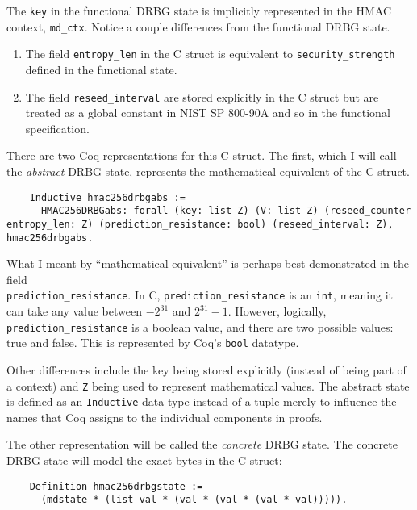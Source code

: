 \documentclass[pageno]{jpaper}
\begin{document}
The \lstinline{key} in the functional DRBG state is implicitly represented in the HMAC context, \lstinline{md_ctx}. Notice a couple differences from the functional DRBG state.


\begin{enumerate}
\item The field \lstinline{entropy_len} in the C struct is equivalent to \lstinline{security_strength} defined in the functional state.
\item The field \lstinline{reseed_interval} are stored explicitly in the C struct but are treated as a global constant in NIST SP 800-90A and so in the functional specification.
\end{enumerate}


There are two Coq representations for this C struct. The first, which I will call the \textit{abstract} DRBG state, represents the mathematical equivalent of the C struct.

\begin{lstlisting}
    Inductive hmac256drbgabs :=
      HMAC256DRBGabs: forall (key: list Z) (V: list Z) (reseed_counter entropy_len: Z) (prediction_resistance: bool) (reseed_interval: Z), hmac256drbgabs.
\end{lstlisting}

What I meant by “mathematical equivalent” is perhaps best demonstrated in the field \\ \lstinline{prediction_resistance}. In C, \lstinline{prediction_resistance} is an \lstinline{int}, meaning it can take any value between $-2^{31}$ and $2^{31} - 1$. However, logically, \lstinline{prediction_resistance} is a boolean value, and there are two possible values: true and false. This is represented by Coq’s \lstinline{bool} datatype.

Other differences include the key being stored explicitly (instead of being part of a context) and \lstinline{Z} being used to represent mathematical values. The abstract state is defined as an \lstinline{Inductive} data type instead of a tuple merely to influence the names that Coq assigns to the individual components in proofs.

The other representation will be called the \textit{concrete} DRBG state. The concrete DRBG state will model the exact bytes in the C struct:

\begin{lstlisting}
    Definition hmac256drbgstate :=
      (mdstate * (list val * (val * (val * (val * val))))).
\end{lstlisting}
\end{document}
